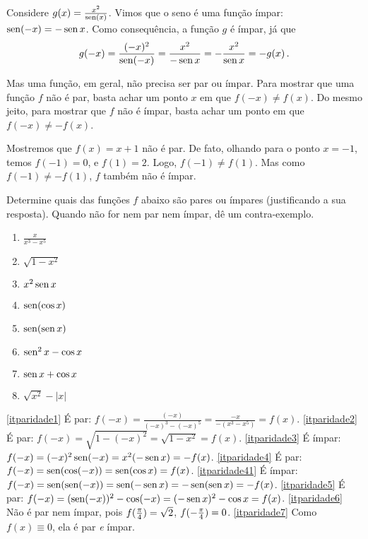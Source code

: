 \begin{ex}
Considere $g(x)=\frac{x^2}{\operatorname{sen} (x)}$.
Vimos que o seno é uma função ímpar: $\operatorname{sen}(-x)=-\operatorname{sen} x$. 
Como consequência, a função $g$ é ímpar, já que
\[
g(-x)=\frac{(-x)^2}{\operatorname{sen}(-x)}=\frac{x^2}{-\operatorname{sen} x}=
-\frac{x^2}{\operatorname{sen} x}=-g(x)\,.
\]
\end{ex}
Mas uma função, em geral, não precisa ser par ou ímpar.
Para mostrar que uma função $f$ não é par, basta achar um ponto
$x$ em que $f(-x)\neq f(x)$. Do mesmo jeito, para mostrar que $f$ não é ímpar, basta achar um ponto em
que $f(-x)\neq -f(x)$.
\begin{ex}
Mostremos que $f(x)=x+1$ não é par. 
De fato, olhando para o ponto $x=-1$, temos $f(-1)=0$, e $f(1)=2$. Logo,
$f(-1)\neq f(1)$. Mas como $f(-1)\neq -f(1)$, $f$ também não é ímpar.
\end{ex}

\begin{exo}
Determine quais das funções $f$ abaixo são pares ou ímpares (justificando a sua
resposta). Quando não for nem par nem ímpar, dê um contra-exemplo.
\begin{multicols}{4}
\begin{enumerate}
\item\label{itparidade1} $\tfrac{x}{x^3-x^5}$
\item\label{itparidade2} $\sqrt{1-x^2}$
\item\label{itparidade3} $x^2\operatorname{sen} x$
\item\label{itparidade4} $\operatorname{sen} (\cos x)$
\item\label{itparidade41} $\operatorname{sen} (\operatorname{sen} x)$
\item\label{itparidade5} $\operatorname{sen}^2 x-\cos x$
\item\label{itparidade6} $\operatorname{sen} x+\cos x$
\item\label{itparidade7} $\sqrt{x^2}-|x|$
\end{enumerate}
\end{multicols}
\vspace{0.01cm}
\begin{sol}
\eqref{itparidade1} É par: $f(-x)=\tfrac{(-x)}{(-x)^3-(-x)^5}=\tfrac{-x}{-(x^3-x^5)}=f(x)$.
\eqref{itparidade2} É par: $f(-x)=\sqrt{1-(-x)^2}=\sqrt{1-x^2}=f(x)$.
\eqref{itparidade3} É ímpar: $f(-x)=(-x)^2\operatorname{sen} (-x)=x^2(-\operatorname{sen} x)=-f(x)$.
\eqref{itparidade4} É par: $f(-x)=\operatorname{sen} (\cos(-x))=\operatorname{sen}(\cos x)=f(x)$.
\eqref{itparidade41} É ímpar: $f(-x)=\operatorname{sen} (\operatorname{sen}(-x))=\operatorname{sen}(-\operatorname{sen} x)=-\operatorname{sen}(\operatorname{sen} x)=-f(x)$.
\eqref{itparidade5} É par: $f(-x)=(\operatorname{sen}(-x))^2-\cos(-x)=(-\operatorname{sen} x)^2-\cos x=f(x)$.
 \eqref{itparidade6} Não é par nem ímpar, pois $f(\tfrac{\pi}{4})=\sqrt{2}$,
$f(-\tfrac{\pi}{4})=0$.
\eqref{itparidade7} Como $f(x)\equiv 0$, ela é par \emph{e} ímpar.
\end{sol}
\end{exo}


